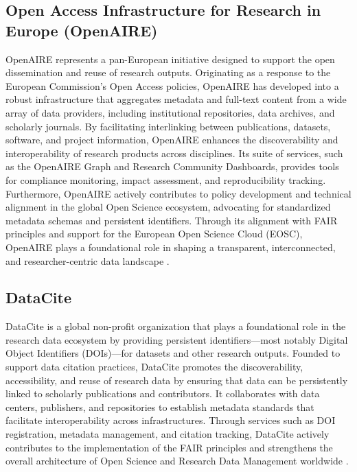 \documentclass{article}
\begin{document}
\subsection{Open Access Infrastructure for Research in Europe (OpenAIRE)}
OpenAIRE represents a pan-European initiative designed to support the open dissemination and reuse of research outputs. Originating as a response to the European Commission's Open Access policies, OpenAIRE has developed into a robust infrastructure that aggregates metadata and full-text content from a wide array of data providers, including institutional repositories, data archives, and scholarly journals. By facilitating interlinking between publications, datasets, software, and project information, OpenAIRE enhances the discoverability and interoperability of research products across disciplines. Its suite of services, such as the OpenAIRE Graph and Research Community Dashboards, provides tools for compliance monitoring, impact assessment, and reproducibility tracking. Furthermore, OpenAIRE actively contributes to policy development and technical alignment in the global Open Science ecosystem, advocating for standardized metadata schemas and persistent identifiers. Through its alignment with FAIR principles and support for the European Open Science Cloud (EOSC), OpenAIRE plays a foundational role in shaping a transparent, interconnected, and researcher-centric data landscape \cite{rettberg_openaire_2012}.

\subsection{DataCite}

DataCite is a global non-profit organization that plays a foundational role in the research data ecosystem by providing persistent identifiers—most notably Digital Object Identifiers (DOIs)—for datasets and other research outputs. Founded to support data citation practices, DataCite promotes the discoverability, accessibility, and reuse of research data by ensuring that data can be persistently linked to scholarly publications and contributors. It collaborates with data centers, publishers, and repositories to establish metadata standards that facilitate interoperability across infrastructures. Through services such as DOI registration, metadata management, and citation tracking, DataCite actively contributes to the implementation of the FAIR principles and strengthens the overall architecture of Open Science and Research Data Management worldwide \cite{brase_datacite_2009}.
\end{document}
